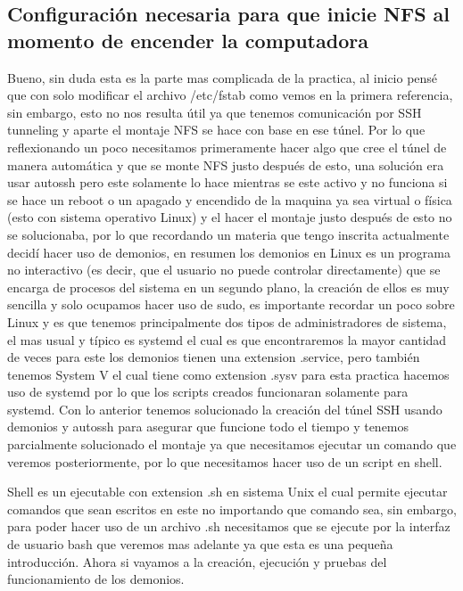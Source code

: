 \documentclass[11pt]{article}
\begin{document}
		\subsection{Configuración necesaria para que inicie NFS al momento de encender la computadora}
		Bueno, sin duda esta es la parte mas complicada de la practica, al inicio pensé que con solo modificar el archivo /etc/fstab como vemos en la primera referencia, sin embargo, esto no nos resulta útil ya que tenemos comunicación por SSH tunneling y aparte el montaje NFS se hace con base en ese túnel. Por lo que reflexionando un poco necesitamos primeramente hacer algo que cree el túnel de manera automática y que se monte NFS justo después de esto, una solución era usar autossh pero este solamente lo hace mientras se este activo y no funciona si se hace un reboot o un apagado y encendido de la maquina ya sea virtual o física (esto con sistema operativo Linux) y el hacer el montaje justo después de esto no se solucionaba, por lo que recordando un materia que tengo inscrita actualmente decidí hacer uso de demonios, en resumen los demonios en Linux es un programa no interactivo (es decir, que el usuario no puede controlar directamente) que se encarga de procesos del sistema en un segundo plano, la creación de ellos es muy sencilla y solo ocupamos hacer uso de sudo, es importante recordar un poco sobre Linux y es que tenemos principalmente dos tipos de administradores de sistema, el mas usual y típico es systemd el cual es que encontraremos la mayor cantidad de veces para este los demonios tienen una extension .service, pero también tenemos System V el cual tiene como extension .sysv para esta practica hacemos uso de systemd por lo que los scripts creados funcionaran solamente para systemd. Con lo anterior tenemos solucionado la creación del túnel SSH usando demonios y autossh para asegurar que funcione todo el tiempo y tenemos parcialmente solucionado el montaje ya que necesitamos ejecutar un comando que veremos posteriormente, por lo que necesitamos hacer uso de un script en shell.\par
		Shell es un ejecutable con extension .sh en sistema Unix el cual permite ejecutar comandos que sean escritos en este no importando que comando sea, sin embargo, para poder hacer uso de un archivo .sh necesitamos que se ejecute por la interfaz de usuario bash que veremos mas adelante ya que esta es una pequeña introducción. Ahora si vayamos a la creación, ejecución y pruebas del funcionamiento de los demonios.
\end{document}
